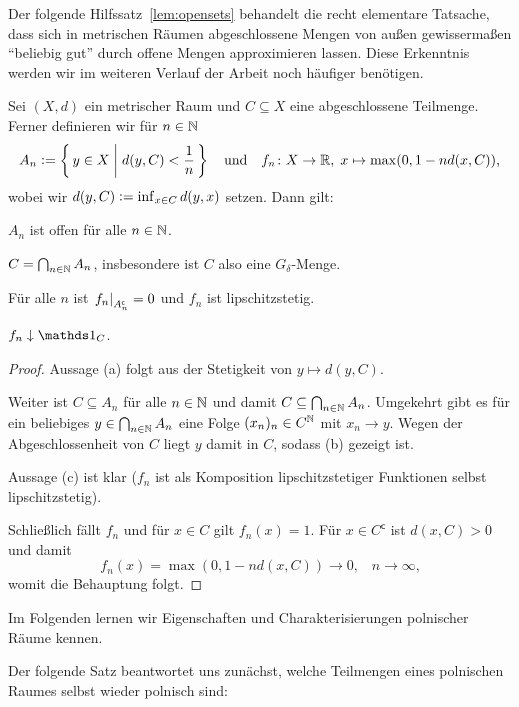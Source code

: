 \documentclass[../main/main.tex]{subfiles}
\begin{document}
	Der folgende Hilfssatz~\ref{lem:opensets} behandelt die recht elementare Tatsache, dass sich in metrischen Räumen 
	abgeschlossene Mengen von außen gewissermaßen \enquote{beliebig gut} durch offene Mengen approximieren lassen. 
	Diese Erkenntnis werden wir im weiteren Verlauf der Arbeit noch häufiger benötigen.
	
	\begin{Hilfssatz}
		\label{lem:opensets}
		Sei $(X, d)$ ein metrischer Raum und $C \subseteq X$ eine abgeschlossene 
		Teilmenge. Ferner definieren wir für $n \in \mathbb{N}$
		$$ A_n \vcentcolon = \left\{\, y \in X \; \middle| \; d(y, C) < \frac{1}{n} \,\right\} \quad \text{und} \quad 
		f_n \colon X \to \mathbb{R}, \; x \mapsto \max (0, 1-n d(x, C))  \text{,}$$
		wobei wir $d(y, C) \vcentcolon = \inf_{x \in C} d(y, x)$ setzen.
		Dann gilt:
		\begin{enumeratethm}
			\item $A_n$ ist offen für alle $n \in \mathbb{N}$.
			\item $C = \bigcap_{n \in \mathbb{N}} A_n$, insbesondere ist $C$ also eine $G_\delta$-Menge.
			\item Für alle $n$ ist $\left.f_n\right|_{A_n^\mathsf{c}} = 0$ und $f_n$ ist lipschitzstetig.
			\item $f_n \convdown \indfct_C$.
		\end{enumeratethm}
	\end{Hilfssatz}
	
	\begin{proof}
		Aussage (a) folgt aus der Stetigkeit von $y \mapsto d(y, C)$.
		
		Weiter ist $C \subseteq A_n$ für alle $n \in \mathbb{N}$ und damit 
		$C \subseteq \bigcap_{n \in \mathbb{N}} A_n$. 
		Umgekehrt gibt es für ein beliebiges $y \in \bigcap_{n \in \mathbb{N}} A_n$
		eine Folge $(x_n)_n \in C^{\mathbb{N}}$ mit $x_n \rightarrow y$. 
		Wegen der Abgeschlossenheit von $C$ liegt $y$ damit in $C$, sodass (b) gezeigt ist.
		
		Aussage (c) ist klar ($f_n$ ist als Komposition 
		lipschitzstetiger Funktionen selbst lipschitzstetig).
		
		Schließlich fällt $f_n$ und für $x \in C$ gilt $f_n(x) = 1$. 
		Für $x \in C^\mathsf{c}$ ist $d(x, C) > 0$ und damit
		$$f_n(x) = \max (0, 1-n d(x, C))
		\to 0 \text{,} \quad n \to \infty \text{,}$$
		womit die Behauptung folgt.
	\end{proof}

	Im Folgenden lernen wir Eigenschaften und Charakterisierungen polnischer Räume kennen.
	
	Der folgende Satz beantwortet uns zunächst, welche Teilmengen eines polnischen Raumes selbst wieder polnisch sind:
\end{document}
